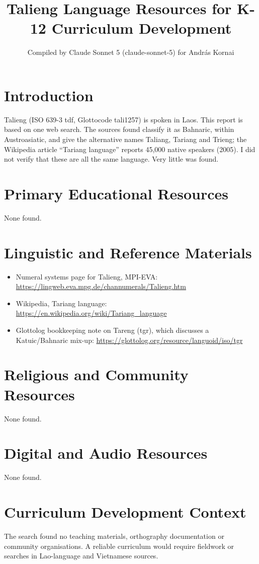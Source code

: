 \documentclass[12pt]{article}
\title{Talieng Language Resources for K-12 Curriculum Development}
\author{Compiled by Claude Sonnet 5 (claude-sonnet-5) for Andr\'as Kornai}
\date{}
\begin{document}
\maketitle
\section{Introduction}
Talieng (ISO 639-3 tdf, Glottocode tali1257) is spoken in Laos. This report is based on one web search. The sources found classify it as Bahnaric, within Austroasiatic, and give the alternative names Taliang, Tariang and Trieng; the Wikipedia article ``Tariang language'' reports 45,000 native speakers (2005). I did not verify that these are all the same language. Very little was found.
\section{Primary Educational Resources}
None found.
\section{Linguistic and Reference Materials}
\begin{itemize}
\item Numeral systems page for Talieng, MPI-EVA: \url{https://lingweb.eva.mpg.de/channumerals/Talieng.htm}
\item Wikipedia, Tariang language: \url{https://en.wikipedia.org/wiki/Tariang_language}
\item Glottolog bookkeeping note on Tareng (tgr), which discusses a Katuic/Bahnaric mix-up: \url{https://glottolog.org/resource/languoid/iso/tgr}
\end{itemize}
\section{Religious and Community Resources}
None found.
\section{Digital and Audio Resources}
None found.
\section{Curriculum Development Context}
The search found no teaching materials, orthography documentation or community organisations. A reliable curriculum would require fieldwork or searches in Lao-language and Vietnamese sources.
\end{document}
